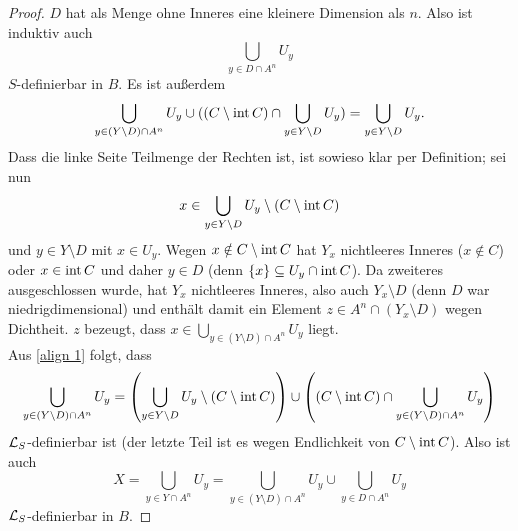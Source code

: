 \begin{proof}
	$D$ hat als Menge ohne Inneres eine kleinere Dimension als $n$. Also ist induktiv auch $$\bigcup\limits_{y\in D\cap A^n}U_y$$ $S$-definierbar in $B$. Es ist außerdem
	\begin{align}\label{align 1}
	\bigcup\limits_{y\in (Y\setminus D)\cap A^n}U_y\cup((C\setminus\operatorname{int} C)\cap\bigcup\limits_{y\in Y\setminus D}U_y)=\bigcup\limits_{y\in Y\setminus D}U_y.
	\end{align}
	Dass die linke Seite Teilmenge der Rechten ist, ist sowieso klar per Definition; sei nun $$x\in\bigcup\limits_{y\in Y\setminus D}U_y\setminus (C\setminus\operatorname{int} C)$$ und $y\in Y\setminus D$ mit $x\in U_y$. Wegen $x\notin C\setminus\operatorname{int} C$ hat $Y_x$ nichtleeres Inneres ($x\notin C$) oder $x\in\operatorname{int} C$ und daher $y\in D$ (denn $\{x\}\subseteq U_y\cap\operatorname{int} C$). Da zweiteres ausgeschlossen wurde, hat $Y_x$ nichtleeres Inneres, also auch $Y_x\setminus D$ (denn $D$ war niedrigdimensional) und enthält damit ein Element $z\in A^n\cap(Y_x\setminus D)$ wegen Dichtheit. $z$ bezeugt, dass $x\in\bigcup\limits_{y\in (Y\setminus D)\cap A^n}U_y$ liegt.\\
	Aus \ref{align 1} folgt, dass $$\bigcup\limits_{y\in (Y\setminus D)\cap A^n}U_y=\left(\bigcup\limits_{y\in Y\setminus D}U_y\setminus(C\setminus\operatorname{int} C)\right)\cup\left((C\setminus\operatorname{int} C)\cap\bigcup\limits_{y\in (Y\setminus D)\cap A^n}U_y\right)$$ $\mathcal{L}_S$-definierbar ist (der letzte Teil ist es wegen Endlichkeit von $C\setminus\operatorname{int} C$). Also ist auch $$X=\bigcup\limits_{y\in Y\cap A^n}U_y=\bigcup\limits_{y\in (Y\setminus D)\cap A^n}U_y\cup\bigcup\limits_{y\in D\cap A^n}U_y$$ $\mathcal{L}_S$-definierbar in $B$.
\end{proof}

